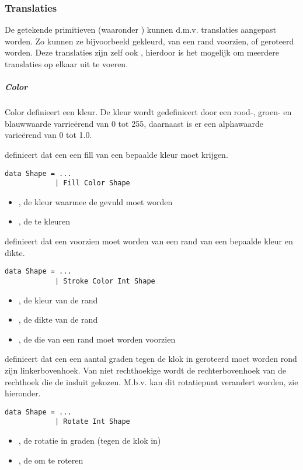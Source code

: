 \subsubsection{Translaties}
De getekende primitieven (waaronder ) kunnen d.m.v. translaties aangepast worden. Zo kunnen ze bijvoorbeeld gekleurd, van een rand voorzien, of geroteerd worden. Deze translaties zijn zelf ook \shapes, hierdoor is het mogelijk om meerdere translaties op elkaar uit te voeren. 

\subparagraph{Color}
Color definieert een kleur. De kleur wordt gedefinieert door een rood-, groen- en blauwwaarde varrieërend van 0 tot 255, daarnaast is er een alphawaarde varieërend van 0 tot 1.0.  

 definieert dat een \shape een fill van een bepaalde kleur moet krijgen. 
\begin{lstlisting}
data Shape = ...
			| Fill Color Shape
\end{lstlisting}
\begin{itemize}
	\item {}, de kleur waarmee de \shape gevuld moet worden
	\item {}, de te kleuren \shape
\end{itemize}

 definieert dat een \shape voorzien moet worden van een rand van een bepaalde kleur en dikte.
\begin{lstlisting}
data Shape = ...
			| Stroke Color Int Shape
\end{lstlisting}
\begin{itemize}
	\item {}, de kleur van de rand
	\item {}, de dikte van de rand
	\item {}, de \shape die van een rand moet worden voorzien
\end{itemize}

 definieert dat een \shape een aantal graden tegen de klok in geroteerd moet worden rond zijn linkerbovenhoek. Van niet rechthoekige \shapes wordt de rechterbovenhoek van de rechthoek die de \shape insluit gekozen. M.b.v.  kan dit rotatiepunt verandert worden, zie hieronder.
\begin{lstlisting}
data Shape = ...
			| Rotate Int Shape
\end{lstlisting}
\begin{itemize}
	\item {}, de rotatie in graden (tegen de klok in)
	\item {}, de \shape om te roteren
\end{itemize}

